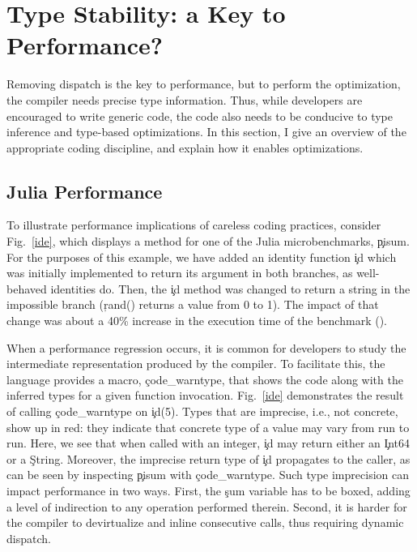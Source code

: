 \section{Type Stability: a Key to Performance?}%
\label{sec:stability}

Removing dispatch is the key to performance, but to perform the optimization,
the compiler needs precise type information. Thus, while developers
are encouraged to write generic code, the code also needs to be conducive
to type inference and type-based optimizations.
In this section, I give an overview of the appropriate coding discipline, and
explain how it enables optimizations.

\subsection{Julia Performance}\label{ssec:perf}

To illustrate performance implications of careless
coding practices, consider Fig.~\ref{ide}, which displays a method for one of
the Julia microbenchmarks, \c{pisum}. For the purposes of this example, we
have added an identity function \c{id} which was initially implemented to
return its argument in both branches, as well-behaved identities do.
Then, the \c{id} method was changed to return a string in the impossible
branch (\c{rand()} returns a value from 0 to 1). The impact of that change
was about a 40\% increase in the execution time of the benchmark (\juliaversion).



When a performance regression occurs, it is common for developers to study the
intermediate representation produced by the compiler. To facilitate this, the
language provides a macro, \c{code_warntype}, that shows the code along with the
inferred types for a given function invocation. Fig.~\ref{ide} demonstrates the result of
calling \c{code_warntype} on \c{id(5)}. Types that are imprecise, i.e., not
concrete, show up in red: they indicate that concrete type of a value may vary
from run to run. Here, we see that when called with an integer,
\c{id} may return either an
\c{Int64} or a \c{String}.
Moreover, the imprecise return type of \c{id} propagates to the caller,
as can be seen by inspecting \c{pisum} with \c{code_warntype}.
%
Such type imprecision can impact performance in two ways. First,
the \c{sum} variable has to be boxed, adding a level of indirection to
any operation performed therein. Second, it is harder for
the compiler to devirtualize and inline consecutive calls, thus requiring
dynamic dispatch.

